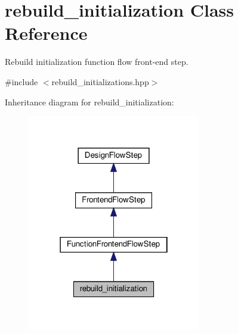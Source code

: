 \hypertarget{classrebuild__initialization}{}\section{rebuild\+\_\+initialization Class Reference}
\label{classrebuild__initialization}


Rebuild initialization function flow front-\/end step.  




{\ttfamily \#include $<$rebuild\+\_\+initializations.\+hpp$>$}



Inheritance diagram for rebuild\+\_\+initialization\+:
\nopagebreak
\begin{figure}[H]
\begin{center}
\leavevmode
\includegraphics[width=214pt]{dc/d47/classrebuild__initialization__inherit__graph}
\end{center}
\end{figure}


